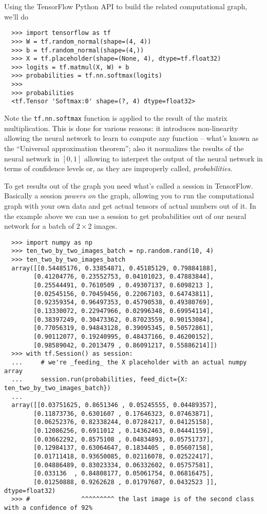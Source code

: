 Using the TensorFlow Python API to build the related computational
graph, we'll do

\begin{verbatim}
  >>> import tensorflow as tf
  >>> W = tf.random_normal(shape=(4, 4))
  >>> b = tf.random_normal(shape=(4,))
  >>> X = tf.placeholder(shape=(None, 4), dtype=tf.float32)
  >>> logits = tf.matmul(X, W) + b
  >>> probabilities = tf.nn.softmax(logits)
  >>>
  >>> probabilities
  <tf.Tensor 'Softmax:0' shape=(?, 4) dtype=float32>
\end{verbatim}

Note the \texttt{tf.nn.softmax} function is applied to the result of
the matrix multiplication. This is done for various reasons: it
introduces non-linearity allowing the neural network to learn to
compute any function -- what's known as the ``Universal approximation
theorem''; also it normalizes the results of the neural network in
$[0,1]$ allowing to interpret the output of the neural network in terms
of confidence levels or, as they are improperly called,
\emph{probabilities}.

To get results out of the graph you need what's called a session in
TensorFlow. Basically a session \emph{powers on} the graph, allowing
you to run the computational graph with your own data and get actual
tensors of actual numbers out of it. In the example above we can use a
session to get probabilities out of our neural network for a batch of
\( 2 \times 2 \) images.

\begin{verbatim}
  >>> import numpy as np
  >>> ten_two_by_two_images_batch = np.random.rand(10, 4)
  >>> ten_two_by_two_images_batch 
  array([[0.54485176, 0.33854871, 0.45185129, 0.79884188],
        [0.41204776, 0.23552753, 0.04101023, 0.47883844],
        [0.25544491, 0.7610509 , 0.49307137, 0.6098213 ],
        [0.02545156, 0.70459456, 0.22067103, 0.64743811],
        [0.92359354, 0.96497353, 0.45790538, 0.49380769],
        [0.13330072, 0.22947966, 0.02996348, 0.69954114],
        [0.38397249, 0.30473362, 0.87023559, 0.90153084],
        [0.77056319, 0.94843128, 0.39095345, 0.50572861],
        [0.90112077, 0.19240995, 0.48437166, 0.46200152],
        [0.98589042, 0.2013479 , 0.86091217, 0.55886214]])
  >>> with tf.Session() as session:
  ...     # we're _feeding_ the X placeholder with an actual numpy array
  ...     session.run(probabilities, feed_dict={X: ten_two_by_two_images_batch})
  ...
  array([[0.03751625, 0.8651346 , 0.05245555, 0.04489357],
        [0.11873736, 0.6301607 , 0.17646323, 0.07463871],
        [0.06252376, 0.82338244, 0.07284217, 0.04125158],
        [0.12086256, 0.6911012 , 0.14362463, 0.04441159],
        [0.03662292, 0.8575108 , 0.04834893, 0.05751737],
        [0.12984137, 0.63064647, 0.1834405 , 0.05607158],
        [0.01711418, 0.93650085, 0.02116078, 0.02522417],
        [0.04886489, 0.83023334, 0.06332602, 0.05757581],
        [0.033136  , 0.84808177, 0.05061754, 0.06816475],
        [0.01250888, 0.9262628 , 0.01797607, 0.0432523 ]], dtype=float32)
  >>> #              ^^^^^^^^^ the last image is of the second class with a confidence of 92%
\end{verbatim}

